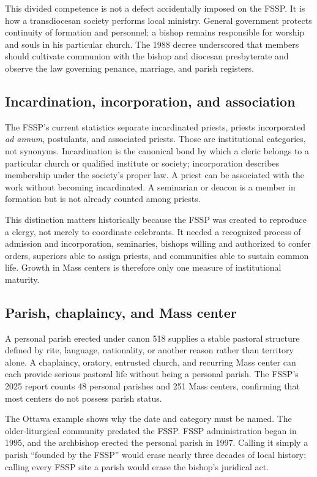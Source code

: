 This divided competence is not a defect accidentally imposed on the FSSP. It is how a transdiocesan society performs local ministry. General government protects continuity of formation and personnel; a bishop remains responsible for worship and souls in his particular church. The 1988 decree underscored that members should cultivate communion with the bishop and diocesan presbyterate and observe the law governing penance, marriage, and parish registers.

\subsection{Incardination, incorporation, and association}

The FSSP's current statistics separate incardinated priests, priests incorporated \emph{ad annum}, postulants, and associated priests. Those are institutional categories, not synonyms. Incardination is the canonical bond by which a cleric belongs to a particular church or qualified institute or society; incorporation describes membership under the society's proper law. A priest can be associated with the work without becoming incardinated. A seminarian or deacon is a member in formation but is not already counted among priests.

This distinction matters historically because the FSSP was created to reproduce a clergy, not merely to coordinate celebrants. It needed a recognized process of admission and incorporation, seminaries, bishops willing and authorized to confer orders, superiors able to assign priests, and communities able to sustain common life. Growth in Mass centers is therefore only one measure of institutional maturity.

\subsection{Parish, chaplaincy, and Mass center}

A personal parish erected under canon 518 supplies a stable pastoral structure defined by rite, language, nationality, or another reason rather than territory alone. A chaplaincy, oratory, entrusted church, and recurring Mass center can each provide serious pastoral life without being a personal parish. The FSSP's 2025 report counts 48 personal parishes and 251 Mass centers, confirming that most centers do not possess parish status.

The Ottawa example shows why the date and category must be named. The older-liturgical community predated the FSSP. FSSP administration began in 1995, and the archbishop erected the personal parish in 1997. Calling it simply a parish ``founded by the FSSP'' would erase nearly three decades of local history; calling every FSSP site a parish would erase the bishop's juridical act.

